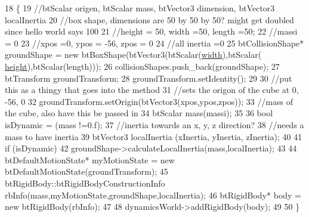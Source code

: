 \begin{DoxyCode}
18                                                                                                            
                                                             \{
19     \textcolor{comment}{//btScalar origen, btScalar mass, btVector3 dimension, btVector3 localInertia}
20     \textcolor{comment}{//box shape, dimensions are 50 by 50 by 50? might get doubled since hello world says 100}
21     \textcolor{comment}{//height = 50, width =50, length =50;}
22     \textcolor{comment}{//massi = 0}
23     \textcolor{comment}{//xpos =0, ypos = -56, zpos = 0}
24     \textcolor{comment}{//all inertia =0}
25     btCollisionShape* groundShape = \textcolor{keyword}{new} btBoxShape(btVector3(btScalar(\hyperlink{test_8cpp_a2474a5474cbff19523a51eb1de01cda4}{width}),btScalar(
      \hyperlink{test_8cpp_ad12fc34ce789bce6c8a05d8a17138534}{height}),btScalar(length)));
26     collisionShapes.push\_back(groundShape);
27     btTransform groundTransform;
28     groundTransform.setIdentity();
29 
30     \textcolor{comment}{//put this as a thingy that goes into the method}
31     \textcolor{comment}{//sets the origon of the cube at 0, -56, 0}
32     groundTransform.setOrigin(btVector3(xpos,ypos,zpos));
33     \textcolor{comment}{//mass of the cube, also have this be passed in}
34     btScalar mass(massi);
35 
36     \textcolor{keywordtype}{bool} isDynamic = (mass !=0.f);
37     \textcolor{comment}{//inertia  towards an x, y, z direction?}
38     \textcolor{comment}{//needs a mass to have inertia}
39     btVector3 localInertia (xInertia, yInertia, zInertia);
40 
41     \textcolor{keywordflow}{if} (isDynamic)
42             groundShape->calculateLocalInertia(mass,localInertia);
43 
44     btDefaultMotionState* myMotionState = \textcolor{keyword}{new} btDefaultMotionState(groundTransform);
45     btRigidBody::btRigidBodyConstructionInfo rbInfo(mass,myMotionState,groundShape,localInertia);
46     btRigidBody* body = \textcolor{keyword}{new} btRigidBody(rbInfo);
47 
48     dynamicsWorld->addRigidBody(body);
49 
50 \}
\end{DoxyCode}
\hypertarget{class_physics___wrapper_a2621954caaa8b88e3ed3dde2032dcb5a}{}
